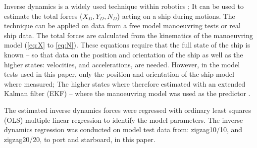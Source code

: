 Inverse dynamics is a widely used technique within robotics \citep{faber_inverse_2018}; It can be used to estimate the total forces ($X_D,Y_D,N_D$) acting on a ship during motions. The technique can be applied on data from a free model manoeuvring tests or real ship data. The total forces are calculated from the kinematics of the manoeuvring model (\autoref{eq:X} to \autoref{eq:N}). These equations require that the full state of the ship is known -- so that data on the position and orientation of the ship as well as the higher states: velocities, and accelerations, are needed.
However, in the model tests used in this paper, only the position and orientation of the ship model where measured;
The higher states where therefore estimated with an extended Kalman filter (EKF) -- where the manoeuvring model was used as the predictor \citep{alexandersson_wpcc_2022}.

The estimated inverse dynamics forces were regressed with ordinary least squares (OLS) multiple
linear regression to identify the model parameters. The inverse dynamics regression was conducted on model test data from: zigzag10/10, and zigzag20/20, to port and starboard, in this paper.  